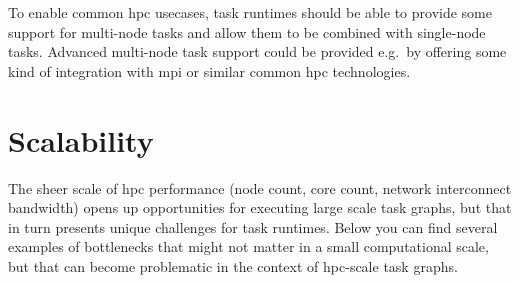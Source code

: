 To enable common \gls{hpc} usecases, task runtimes should be able to provide some
support for multi-node tasks and allow them to be combined with single-node tasks. Advanced
multi-node task support could be provided e.g.\ by offering some kind of integration with
\gls{mpi} or similar common \gls{hpc} technologies.

\section{Scalability}
The sheer scale of \gls{hpc} performance (node count, core count, network
interconnect bandwidth) opens up opportunities for executing large scale task graphs, but that in
turn presents unique challenges for task runtimes. Below you can find several examples of
bottlenecks that might not matter in a small computational scale, but that can become problematic
in the context of \gls{hpc}-scale task graphs.


